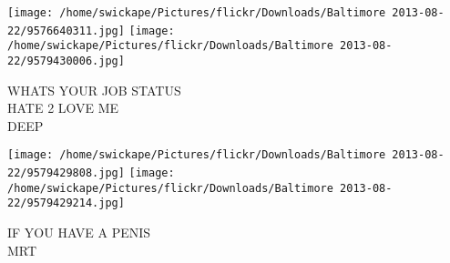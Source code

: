 \documentclass[10pt,letterpaper]{article}
\begin{document}
\vspace{0.25in}
\texttt{[image: /home/swickape/Pictures/flickr/Downloads/Baltimore 2013-08-22/9576640311.jpg]}
\texttt{[image: /home/swickape/Pictures/flickr/Downloads/Baltimore 2013-08-22/9579430006.jpg]}

WHATS YOUR JOB STATUS\\
HATE 2 LOVE ME\\
DEEP\\
\pagebreak

\texttt{[image: /home/swickape/Pictures/flickr/Downloads/Baltimore 2013-08-22/9579429808.jpg]}
\texttt{[image: /home/swickape/Pictures/flickr/Downloads/Baltimore 2013-08-22/9579429214.jpg]}

IF YOU HAVE A PENIS\\
MRT\\
\pagebreak
\end{document}
